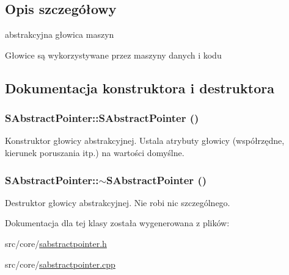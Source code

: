 \subsection{Opis szczegółowy}
abstrakcyjna głowica maszyn 

Głowice są wykorzystywane przez maszyny danych i kodu 

\subsection{Dokumentacja konstruktora i destruktora}
\hypertarget{classSAbstractPointer_9281c3dba0da68460fa87bd17bd768b4}{
\subsubsection[{SAbstractPointer}]{\setlength{\rightskip}{0pt plus 5cm}SAbstractPointer::SAbstractPointer ()}}
\label{classSAbstractPointer_9281c3dba0da68460fa87bd17bd768b4}


Konstruktor głowicy abstrakcyjnej. Ustala atrybuty głowicy (współrzędne, kierunek poruszania itp.) na wartości domyślne. \hypertarget{classSAbstractPointer_9973354ecf610b3d48170dd70f0b22ce}{
\subsubsection[{$\sim$SAbstractPointer}]{\setlength{\rightskip}{0pt plus 5cm}SAbstractPointer::$\sim$SAbstractPointer ()}}
\label{classSAbstractPointer_9973354ecf610b3d48170dd70f0b22ce}


Destruktor głowicy abstrakcyjnej. Nie robi nic szczególnego. 

Dokumentacja dla tej klasy została wygenerowana z plików:\begin{CompactItemize}
\item 
src/core/\hyperlink{sabstractpointer_8h}{sabstractpointer.h}\item 
src/core/\hyperlink{sabstractpointer_8cpp}{sabstractpointer.cpp}\end{CompactItemize}
